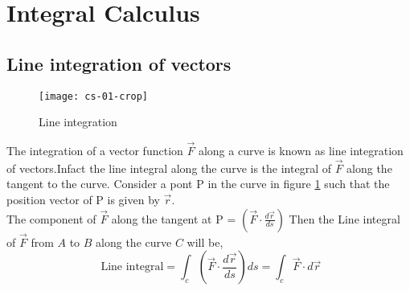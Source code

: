 \section{Integral Calculus}
\subsection{Line integration of vectors}
\begin{figure}[H]
	\begin{center}
\texttt{[image: cs-01-crop]}
		
	\end{center}
\caption{Line integration}
\label{line integration}	
\end{figure}
The integration of a vector function $\vec F$ along a curve is known as line integration of vectors.Infact the line integral along the curve is the integral of $\vec F$ along the tangent to the curve. 
 Consider a pont P in the curve in figure \ref{line integration} such that the position vector of P is given by $\vec r$.\\The component of $\vec F$ along the tangent at P = $\left(\vec{F} \cdot \frac{d \vec{r}}{d s}\right)$ \newline Then the Line integral of $\vec{F}$ from $A$ to $B$ along the curve $C$ will be, 
 $$\text{ Line integral}=\int_{c}\left(\vec{F} \cdot \frac{d \vec{r}}{d s}\right) d s=\int_{c} \vec{F} \cdot d \vec{r}$$


